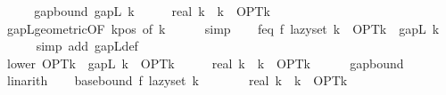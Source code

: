 \begin{isabellebody}
%
\isadelimproof
%
\endisadelimproof
%
\isatagproof
{}\isamarkupfalse%
\ {\isacharminus}{\kern0pt}\isanewline
\ \ \isamarkupfalse%
\ gap{\isacharunderscore}{\kern0pt}bound{\isacharcolon}{\kern0pt}\ {\isachardoublequoteopen}gapL\ k\ {\isasymle}\ {\isacharparenleft}{\kern0pt}{}\ {\isacharminus}{\kern0pt}\ {}\ {\isacharslash}{\kern0pt}\ real\ k{\isacharparenright}{\kern0pt}\ {\isacharcircum}{\kern0pt}\ k\ {\isacharasterisk}{\kern0pt}\ OPT{\isacharunderscore}{\kern0pt}k{\isachardoublequoteclose}\isanewline
\ \ \ \ \isamarkupfalse%
\ gapL{\isacharunderscore}{\kern0pt}geometric{\isacharbrackleft}{\kern0pt}OF\ k{\isacharunderscore}{\kern0pt}pos{\isacharcomma}{\kern0pt}\ of\ k{\isacharbrackright}{\kern0pt}\isanewline
\ \ \ \ \isamarkupfalse%
\ simp\isanewline
\isanewline
\ \ \isamarkupfalse%
\ f{\isacharunderscore}{\kern0pt}eq{\isacharcolon}{\kern0pt}\ {\isachardoublequoteopen}f\ {\isacharparenleft}{\kern0pt}lazy{\isacharunderscore}{\kern0pt}set\ k{\isacharparenright}{\kern0pt}\ {\isacharequal}{\kern0pt}\ OPT{\isacharunderscore}{\kern0pt}k\ {\isacharminus}{\kern0pt}\ gapL\ k{\isachardoublequoteclose}\isanewline
\ \ \ \ \isamarkupfalse%
\ {\isacharparenleft}{\kern0pt}simp\ add{\isacharcolon}{\kern0pt}\ gapL{\isacharunderscore}{\kern0pt}def{\isacharparenright}{\kern0pt}\isanewline
\isanewline
\ \ \isamarkupfalse%
\ lower{\isacharcolon}{\kern0pt}\ {\isachardoublequoteopen}OPT{\isacharunderscore}{\kern0pt}k\ {\isacharminus}{\kern0pt}\ gapL\ k\ {\isasymge}\ OPT{\isacharunderscore}{\kern0pt}k\ {\isacharminus}{\kern0pt}\ {\isacharparenleft}{\kern0pt}{}\ {\isacharminus}{\kern0pt}\ {}\ {\isacharslash}{\kern0pt}\ real\ k{\isacharparenright}{\kern0pt}\ {\isacharcircum}{\kern0pt}\ k\ {\isacharasterisk}{\kern0pt}\ OPT{\isacharunderscore}{\kern0pt}k{\isachardoublequoteclose}\isanewline
\ \ \ \ \isamarkupfalse%
\ gap{\isacharunderscore}{\kern0pt}bound\ \isamarkupfalse%
\ linarith\isanewline
\isanewline
\ \ \isamarkupfalse%
\ base{\isacharunderscore}{\kern0pt}bound{\isacharcolon}{\kern0pt}\ {\isachardoublequoteopen}f\ {\isacharparenleft}{\kern0pt}lazy{\isacharunderscore}{\kern0pt}set\ k{\isacharparenright}{\kern0pt}\ {\isasymge}\ {\isacharparenleft}{\kern0pt}{}\ {\isacharminus}{\kern0pt}\ {\isacharparenleft}{\kern0pt}{}\ {\isacharminus}{\kern0pt}\ {}\ {\isacharslash}{\kern0pt}\ real\ k{\isacharparenright}{\kern0pt}\ {\isacharcircum}{\kern0pt}\ k{\isacharparenright}{\kern0pt}\ {\isacharasterisk}{\kern0pt}\ OPT{\isacharunderscore}{\kern0pt}k{\isachardoublequoteclose}\isanewline

\end{isabellebody}
